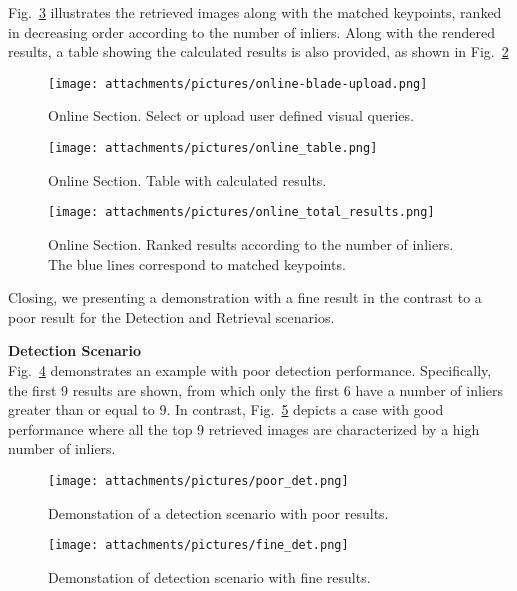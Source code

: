 Fig.~\ref{fig:online_results} illustrates the retrieved images 
along with the matched keypoints, ranked in decreasing order
according to the number of inliers. Along with the rendered results, a table showing the
calculated results is also provided, as shown in Fig.~\ref{fig:online_table}


\begin{figure}[ht!]
  \centering
  \texttt{[image: attachments/pictures/online-blade-upload.png]}
  \caption{Online Section. Select or upload user defined visual queries.}
  \label{fig:online_upload}
\end{figure} 

\begin{figure}[H]
  \centering
  \texttt{[image: attachments/pictures/online\_table.png]}
  \caption{Online Section. Table with calculated results.}
  \label{fig:online_table}
\end{figure} 

\newpage
\begin{figure}[ht!]
  \centering
  \texttt{[image: attachments/pictures/online\_total\_results.png]}
  \caption{Online Section. Ranked results according to the number of inliers. The blue lines correspond to matched keypoints.}
  \label{fig:online_results}
\end{figure} 


Closing, we presenting a demonstration with a fine result in the contrast to a poor result for the Detection and Retrieval scenarios.

\textbf{\large{Detection Scenario}}\\
Fig.~\ref{fig:poor_det} demonstrates an example with poor detection performance. Specifically, the first 9 results are shown, from which only the first 6 have a number of inliers greater than or equal to 9. In contrast, Fig.~\ref{fig:fine_det} depicts a case with good performance where all the top 9 retrieved images are characterized by a high number of inliers.



\begin{figure}[ht!]
  \centering
  \texttt{[image: attachments/pictures/poor\_det.png]}
  \caption{Demonstation of a detection scenario with poor results.}
  \label{fig:poor_det}
\end{figure}
\begin{figure}[H]
  \centering
  \texttt{[image: attachments/pictures/fine\_det.png]}
  \caption{Demonstation of detection scenario with fine results.}
  \label{fig:fine_det}
\end{figure} 

